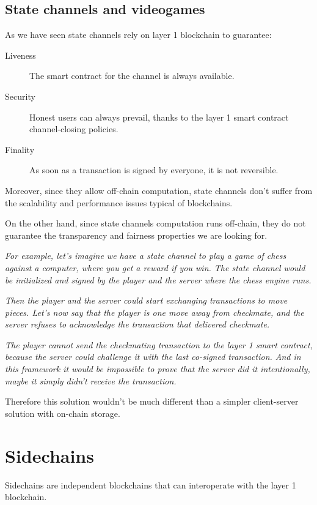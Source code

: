 \documentclass[12pt]{article}
\begin{document}
\subsection{State channels and videogames} \label{subsection:scav}
As we have seen state channels rely on layer 1 blockchain to guarantee:
\begin{description}
    \item[Liveness] The smart contract for the channel is always available. 
    \item[Security] Honest users can always prevail, thanks to the layer 1 smart contract channel-closing policies.
    \item[Finality] As soon as a transaction is signed by everyone, it is not reversible.
\end{description}

Moreover, since they allow off-chain computation, state channels don't suffer from the scalability and performance issues typical of blockchains.

On the other hand, since state channels computation runs off-chain, they do not guarantee the transparency and fairness properties we are looking for.

\textit{For example, let's imagine we have a state channel to play a game of chess against a computer, where you get a reward if you win. The state channel would be initialized and signed by the player and the server where the chess engine runs.}
    
\textit{Then the player and the server could start exchanging transactions to move pieces. Let's now say that the player is one move away from checkmate, and the server refuses to acknowledge the transaction that delivered checkmate.}
    
\textit{The player cannot send the checkmating transaction to the layer 1 smart contract, because the server could challenge it with the last co-signed transaction. And in this framework it would be impossible to prove that the server did it intentionally, maybe it simply didn't receive the transaction.}

Therefore this solution wouldn't be much different than a simpler client-server solution with on-chain storage.

\section{Sidechains} \label{section:sidechains}
Sidechains are independent blockchains that can interoperate with the layer 1 blockchain.
\end{document}
